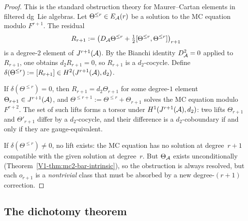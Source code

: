 \begin{proof}
This is the standard obstruction theory for
Maurer--Cartan elements in filtered dg~Lie algebras.
Let $\Theta^{\leq r} \in E_{\mathcal{A}}(r)$ be a solution to the
MC equation modulo $F^{r+1}$. The residual
\[
R_{r+1} :=
\bigl(D_{\mathcal{A}} \Theta^{\leq r}
+ \tfrac{1}{2}[\Theta^{\leq r}, \Theta^{\leq r}]\bigr)_{r+1}
\]
is a degree-$2$ element of $J^{r+1}(\mathcal{A})$.
By the Bianchi identity $D_{\mathcal{A}}^2 = 0$ applied to
$R_{r+1}$, one obtains $d_2 R_{r+1} = 0$, so
$R_{r+1}$ is a $d_2$-cocycle. Define
$\delta(\Theta^{\leq r}) := [R_{r+1}] \in
H^2(J^{r+1}(\mathcal{A}), d_2)$.

If $\delta(\Theta^{\leq r}) = 0$, then $R_{r+1} =
d_2 \Theta_{r+1}$ for some degree-$1$ element
$\Theta_{r+1} \in J^{r+1}(\mathcal{A})$, and
$\Theta^{\leq r+1} := \Theta^{\leq r} + \Theta_{r+1}$
solves the MC equation modulo $F^{r+2}$. The set of
such lifts forms a torsor under $H^1(J^{r+1}(\mathcal{A}), d_2)$:
two lifts $\Theta_{r+1}$ and $\Theta'_{r+1}$ differ by
a $d_2$-cocycle, and their difference is a
$d_2$-coboundary if and only if they are gauge-equivalent.

If $\delta(\Theta^{\leq r}) \neq 0$, no lift exists:
the MC equation has no solution at degree~$r{+}1$
compatible with the given solution at degree~$r$.
But $\Theta_{\mathcal{A}}$ exists unconditionally
(Theorem~\ref*{V1-thm:mc2-bar-intrinsic}), so the
obstruction is always resolved, but
each $o_{r+1}$ is a \emph{nontrivial} class that must
be absorbed by a new degree-$(r{+}1)$ correction.
\end{proof}


\subsection{The dichotomy theorem}

